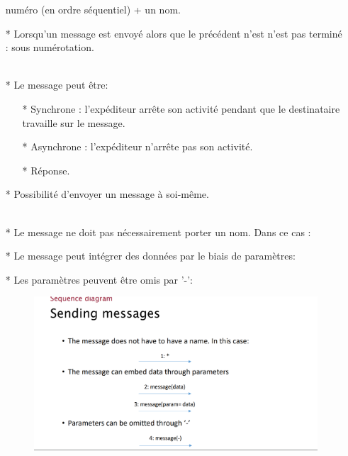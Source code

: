 \documentclass[12pt]{article}
\begin{document}
\begin{itemize}
	numéro (en
	ordre séquentiel)
	+ un nom.
	\item[*] Lorsqu'un message
	est envoyé alors que le
	précédent n'est
	n'est pas terminé : sous numérotation.
	\\
	\\
	\item[*] Le message peut être:
	\begin{itemize}
		\item[*] Synchrone : l'expéditeur arrête son activité pendant que le destinataire travaille sur le message.
		\item[*] Asynchrone : l'expéditeur n'arrête pas son activité.
		\item[*] Réponse.
	\end{itemize}
\item[*] Possibilité d'envoyer un message à soi-même.
\\
\\
\item[*] Le message ne doit pas nécessairement porter un nom. Dans ce cas :
\\
\item[*] Le message peut intégrer des données par le biais de paramètres:
\\
\item[*] Les paramètres peuvent être omis par '-':
\\ 
\begin{figure}[!hbtp]
	\includegraphics[scale=0.75]{Capture7.PNG}
\end{figure}
\end{itemize}
\end{document}
